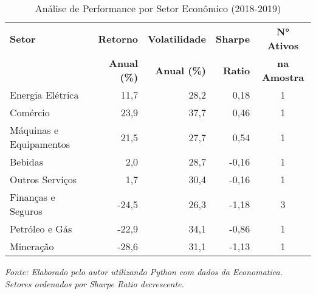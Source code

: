 \begin{table}[H]
\centering
\caption{Análise de Performance por Setor Econômico (2018-2019)}
\begin{tabular}{|l|r|r|r|c|}
\hline
\textbf{Setor} & \textbf{Retorno} & \textbf{Volatilidade} & \textbf{Sharpe} & \textbf{N° Ativos} \\
& \textbf{Anual (\%)} & \textbf{Anual (\%)} & \textbf{Ratio} & \textbf{na Amostra} \\
\hline
Energia Elétrica & 11,7 & 28,2 & 0,18 & 1 \\
\hline
Comércio & 23,9 & 37,7 & 0,46 & 1 \\
\hline
Máquinas e Equipamentos & 21,5 & 27,7 & 0,54 & 1 \\
\hline
Bebidas & 2,0 & 28,7 & -0,16 & 1 \\
\hline
Outros Serviços & 1,7 & 30,4 & -0,16 & 1 \\
\hline
Finanças e Seguros & -24,5 & 26,3 & -1,18 & 3 \\
\hline
Petróleo e Gás & -22,9 & 34,1 & -0,86 & 1 \\
\hline
Mineração & -28,6 & 31,1 & -1,13 & 1 \\
\hline
\end{tabular}

\textit{Fonte: Elaborado pelo autor utilizando Python com dados da Economatica. Setores ordenados por Sharpe Ratio decrescente.}
\label{tab:sector_stats}
\end{table}

